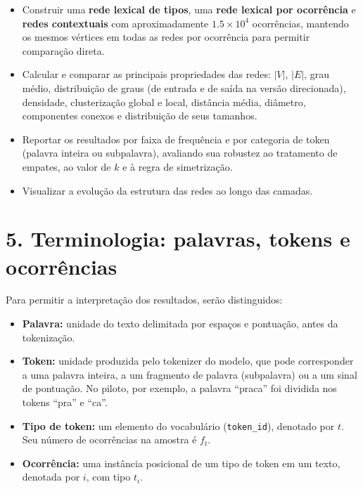\documentclass[11pt,a4paper]{article}
\begin{document}
\begin{itemize}

    \item Construir uma \textbf{rede lexical de tipos}, uma \textbf{rede
    lexical por ocorrência} e \textbf{redes contextuais} com aproximadamente
    $1.5\times10^4$ ocorrências, mantendo os mesmos vértices em todas as redes
    por ocorrência para permitir comparação direta.

    \item Calcular e comparar as principais propriedades das redes:
    $|V|$, $|E|$, grau médio, distribuição de graus (de entrada e de saída na
    versão direcionada), densidade, clusterização global e local, distância
    média, diâmetro, componentes conexos e distribuição de seus tamanhos.

    \item Reportar os resultados por faixa de frequência e por categoria de
    token (palavra inteira ou subpalavra), avaliando sua robustez ao tratamento
    de empates, ao valor de $k$ e à regra de simetrização.

    \item Visualizar a evolução da estrutura das redes ao longo das camadas.

\end{itemize}

\section*{5. Terminologia: palavras, tokens e ocorrências}

Para permitir a interpretação dos resultados, serão distinguidos:

\begin{itemize}

    \item \textbf{Palavra:} unidade do texto delimitada por espaços e
    pontuação, antes da tokenização.

    \item \textbf{Token:} unidade produzida pelo tokenizer do modelo, que
    pode corresponder a uma palavra inteira, a um fragmento de palavra
    (subpalavra) ou a um sinal de pontuação. No piloto, por exemplo, a palavra
    ``praca'' foi dividida nos tokens ``pra'' e ``ca''.

    \item \textbf{Tipo de token:} um elemento do vocabulário (\texttt{token\_id}),
    denotado por $t$. Seu número de ocorrências na amostra é $f_t$.

    \item \textbf{Ocorrência:} uma instância posicional de um tipo de token em
    um texto, denotada por $i$, com tipo $t_i$.

\end{itemize}
\end{document}
